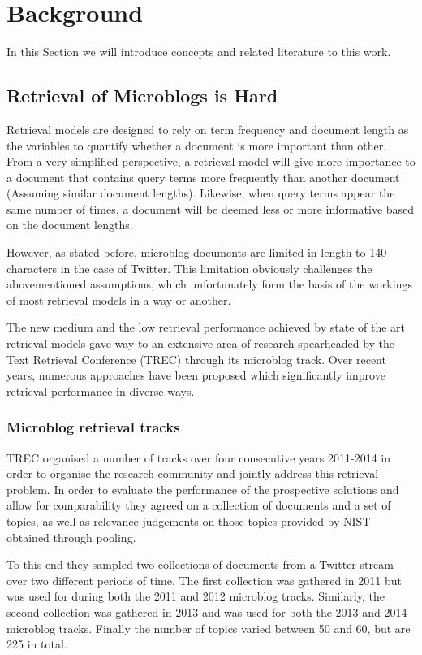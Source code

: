 \section{Background}
\label{background}
In this Section we will introduce concepts and related literature to this work.

\subsection{Retrieval of Microblogs is Hard}
Retrieval models are designed to rely on term frequency and document length as the variables to quantify whether a document is more important than other. From a very simplified perspective, a retrieval model will give more importance to a document that contains query terms more frequently than another document (Assuming similar document lengths). Likewise, when query terms appear the same number of times, a document will be deemed less or more informative based on the document lengths.

However, as stated before, microblog documents are limited in length to 140 characters in the case of Twitter. This limitation obviously challenges the abovementioned assumptions, which unfortunately form the basis of the workings of most retrieval models in a way or another.

The new medium and the low retrieval performance achieved by state of the art retrieval models gave way to an extensive area of research spearheaded by the Text Retrieval Conference (TREC) through its microblog track. Over recent years, numerous approaches have been proposed which significantly improve retrieval performance in diverse ways. \\

\subsubsection{Microblog retrieval tracks}
TREC organised a number of tracks over four consecutive years 2011-2014 in order to organise the research community and jointly address this retrieval problem. In order to evaluate the performance of the prospective solutions and allow for comparability they agreed on a collection of documents and a set of topics, as well as relevance judgements on those topics provided by NIST obtained through pooling.

To this end they sampled two collections of documents from a Twitter stream over two different periods of time. The first collection was gathered in 2011 but was used for during both the 2011 and 2012 microblog tracks. Similarly, the second collection was gathered in 2013 and was used for both the 2013 and 2014 microblog tracks. Finally the number of topics varied between 50 and 60, but are 225 in total.



